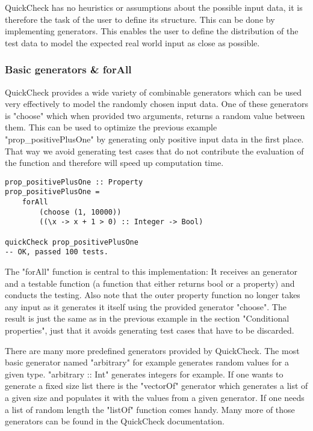 \documentclass[a4paper, 12pt]{article} %
\begin{document}
QuickCheck has no heuristics or assumptions about the possible input data, it is therefore the task of the user to define its structure. This can be done by implementing generators. This enables the user to define the distribution of the test data to model the expected real world input as close as possible.


\subsubsection{Basic generators \& forAll}

QuickCheck provides a wide variety of combinable generators which can be used very effectively to model the randomly chosen input data. One of these generators is "choose" which when provided two arguments, returns a random value between them. This can be used to optimize the previous example "prop\_positivePlusOne" by generating only positive input data in the first place. That way we avoid generating test cases that do not contribute the evaluation of the function and therefore will speed up computation time. 

\begin{verbatim}
prop_positivePlusOne :: Property
prop_positivePlusOne = 
    forAll
        (choose (1, 10000))
        ((\x -> x + 1 > 0) :: Integer -> Bool)

quickCheck prop_positivePlusOne
-- OK, passed 100 tests.
\end{verbatim}

The "forAll" function is central to this implementation: It receives an generator and a testable function (a function that either returns bool or a property) and conducts the testing. Also note that the outer property function no longer takes any input as it generates it itself using the provided generator "choose". The result is just the same as in the previous example in the section "Conditional properties", just that it avoids generating test cases that have to be discarded.

There are many more predefined generators provided by QuickCheck. The most basic generator named "arbitrary" for example generates random values for a given type. "arbitrary :: Int" generates integers for example. If one wants to generate a fixed size list there is the "vectorOf" generator which generates a list of a given size and populates it with the values from a given generator. If one needs a list of random length the "listOf" function comes handy. Many more of those generators can be found in the QuickCheck documentation. \cite{documentation}
\end{document}
